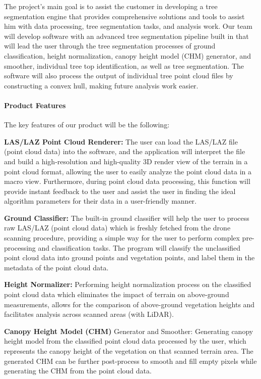 \documentclass[a4paper, 12pt]{article}
\begin{document}
The project's main goal is to assist the customer in developing a tree segmentation engine that provides comprehensive solutions and tools to assist him with data processing, tree segmentation tasks, and analysis work. Our team will develop software with an advanced tree segmentation pipeline built in that will lead the user through the tree segmentation processes of ground classification, height normalization, canopy height model (CHM) generator, and smoother, individual tree top identification, as well as tree segmentation. The software will also process the output of individual tree point cloud files by constructing a convex hull, making future analysis work easier.

\paragraph{Product Features}

The key features of our product will be the following:


\textbf{LAS/LAZ Point Cloud Renderer:} The user can load the LAS/LAZ file (point cloud data) into the software, and the application will interpret the file and build a high-resolution and high-quality 3D render view of the terrain in a point cloud format, allowing the user to easily analyze the point cloud data in a macro view. Furthermore, during point cloud data processing, this function will provide instant feedback to the user and assist the user in finding the ideal algorithm parameters for their data in a user-friendly manner.

\textbf{Ground Classifier:} The built-in ground classifier will help the user to process raw LAS/LAZ (point cloud data) which is freshly fetched from the drone scanning procedure, providing a simple way for the user to perform complex pre-processing and classification tasks. The program will classify the unclassified point cloud data into ground points and vegetation points, and label them in the metadata of the point cloud data.

\textbf{Height Normalizer:} Performing height normalization process on the classified point cloud data which eliminates the impact of terrain on above-ground measurements, allows for the comparison of above-ground vegetation heights and facilitates analysis across scanned areas (with LiDAR).

\textbf{Canopy Height Model (CHM)} Generator and Smoother: Generating canopy height model from the classified point cloud data processed by the user, which represents the canopy height of the vegetation on that scanned terrain area. The generated CHM can be further post-process to smooth and fill empty pixels while generating the CHM from the point cloud data.
\end{document}
